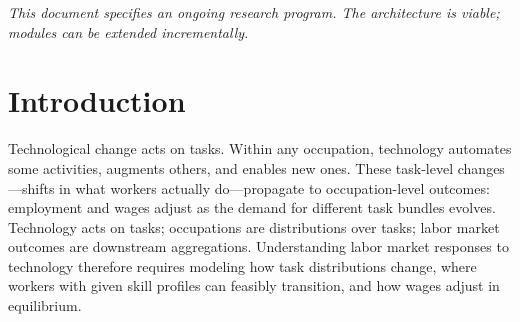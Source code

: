 \documentclass[12pt]{article}
\begin{document}
\vspace{1em}
\noindent{}
\vspace{1em}


\begin{center}
\textit{This document specifies an ongoing research program. The architecture is viable; modules can be extended incrementally.}
\end{center}



\section{Introduction}
\label{sec:introduction}


Technological change acts on tasks. Within any occupation, technology automates some activities, augments others, and enables new ones. These task-level changes---shifts in what workers actually do---propagate to occupation-level outcomes: employment and wages adjust as the demand for different task bundles evolves. Technology acts on tasks; occupations are distributions over tasks; labor market outcomes are downstream aggregations. Understanding labor market responses to technology therefore requires modeling how task distributions change, where workers with given skill profiles can feasibly transition, and how wages adjust in equilibrium.
\end{document}
